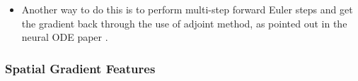\documentclass[10pt]{article}
\begin{document}
\begin{itemize}
\begin{itemize}
\begin{itemize}
            \item Diffusion for time $t$ for the coefficient $c_i$ is given by
            \begin{align*}
                c_i(t) = e^{-\lambda_i t} c_i(0).
            \end{align*}

            \item As a result, we have that
            \begin{align*}
                h_t(u) = \Phi \begin{bmatrix} e^{-\lambda_1 t} \\ e^{-\lambda_2 t} \\ \vdots \\ e^{-\lambda_k t} \end{bmatrix} \odot (\Phi^T M u).
            \end{align*}
            Here, $\odot$ denotes element-wise multiplication.
        \end{itemize}
    \end{itemize}    

    \item Another way to do this is to perform multi-step forward Euler steps and get the gradient back through the use of adjoint method, as pointed out in the neural ODE paper \cite{Chen:2018:NODE}.
\end{itemize}

\subsubsection{Spatial Gradient Features}
\end{document}
